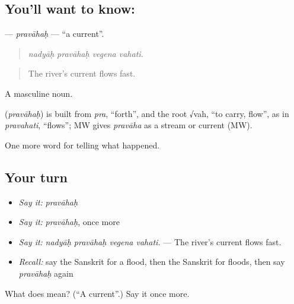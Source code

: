 \subsection*{You'll want to know: }
\textbf{} — \emph{pravāhaḥ} — \textquotedblleft{}a current\textquotedblright{}.

\begin{quote}
   
\end{quote}

\begin{quote}
\emph{nadyāḥ pravāhaḥ vegena vahati.}
\end{quote}

\begin{quote}
The river's current flows fast.
\end{quote}

A masculine noun.

\begin{cousinweb}
\textbf{} (\emph{pravāhaḥ}) is built from \emph{pra}, \textquotedblleft{}forth\textquotedblright{}, and the root √vah, \textquotedblleft{}to carry, flow\textquotedblright{}, as in \emph{pravahati}, \textquotedblleft{}flows\textquotedblright{}; MW gives \emph{pravāha} as a stream or current (MW).
\end{cousinweb}

\begin{grammarlens}[title={What you've built}]
One more word for telling what happened.
\end{grammarlens}

\subsection*{Your turn}
\begin{itemize}
\raggedright
  \item \emph{Say it:} \emph{pravāhaḥ}
  \item \emph{Say it:} \emph{pravāhaḥ}, once more
  \item \emph{Say it:} \emph{nadyāḥ pravāhaḥ vegena vahati.} — The river's current flows fast.
  \item \emph{Recall:} say the Sanskrit for a flood, then the Sanskrit for floods, then say \emph{pravāhaḥ} again
\end{itemize}

\begin{tcolorbox}[breakable,colback=teal!4,colframe=teal!35!black,title={Before you move on}]
What does  mean? (\textquotedblleft{}A current\textquotedblright{}.) Say it once more.
\end{tcolorbox}
